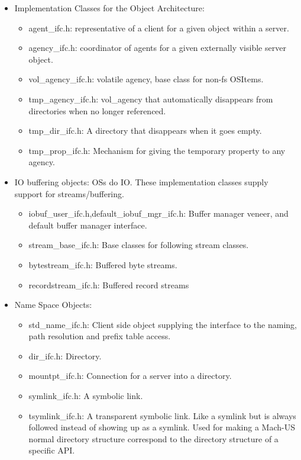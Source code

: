 \begin{itemize}
\item{Implementation Classes for the Object Architecture}:
\begin{itemize}
\item{agent\_ifc.h}: representative of a client for a given object within a
server.
\item{agency\_ifc.h}:  coordinator of agents for a given externally visible
server object.
\item{vol\_agency\_ifc.h}: volatile agency, base class for non-fs OSItems.
\item{tmp\_agency\_ifc.h}: vol\_agency that automatically disappears from
directories when no longer referenced.
\item{tmp\_dir\_ifc.h}: A directory that disappears when it goes empty.
\item{tmp\_prop\_ifc.h}: Mechanism for giving the temporary property to any
agency.
\end{itemize}

\item{IO buffering objects}:
OSs do IO.  These implementation classes supply support for streams/buffering.
\begin{itemize}
\item{iobuf\_user\_ifc.h,default\_iobuf\_mgr\_ifc.h}:   Buffer manager veneer, and
default buffer manager interface.
\item{stream\_base\_ifc.h}: Base classes for following stream classes.
\item{bytestream\_ifc.h}: Buffered byte streams.
\item{recordstream\_ifc.h}: Buffered record streams
\end{itemize}

\item{Name Space Objects}:
\begin{itemize}
\item{std\_name\_ifc.h}: Client side object supplying the interface to
the naming, path resolution and prefix table access.
\item{dir\_ifc.h}: Directory.
\item{mountpt\_ifc.h}: Connection for a server into a directory.
\item{symlink\_ifc.h}: A symbolic link.
\item{tsymlink\_ifc.h}:  A transparent symbolic link.  Like a symlink but
is always followed instead of showing up as a symlink.  Used for making
a Mach-US normal directory structure correspond to the directory structure
of a specific API.
\end{itemize}


\end{itemize}
